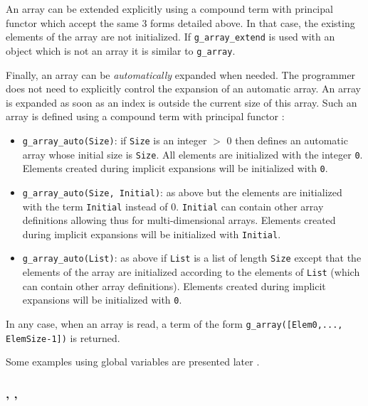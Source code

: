 An array can be extended explicitly using a compound term with principal
functor  which accept the same 3 forms detailed
above. In that case, the existing elements of the array are not
initialized. If \texttt{g\_array\_extend} is used with an object which is not
an array it is similar to \texttt{g\_array}.

Finally, an array can be \textit{automatically} expanded when needed. The
programmer does not need to explicitly control the expansion of an automatic
array. An array is expanded as soon as an index is outside the current size
of this array. Such an array is defined using a compound term with principal
functor :

\begin{itemize}

\item \texttt{g\_array\_auto(Size)}: if \texttt{Size} is an integer $>$ 0
then defines an automatic array whose initial size is \texttt{Size}. All
elements are initialized with the integer \texttt{0}. Elements
created during implicit expansions will be initialized with \texttt{0}.

\item \texttt{g\_array\_auto(Size, Initial)}: as above but the elements are
initialized with the term \texttt{Initial} instead of 0. \texttt{Initial} can
contain other array definitions allowing thus for multi-dimensional
arrays. Elements created during implicit expansions will be initialized with
\texttt{Initial}.

\item \texttt{g\_array\_auto(List)}: as above if \texttt{List} is a list of
length \texttt{Size} except that the elements of the array are initialized
according to the elements of \texttt{List} (which can contain other array
definitions). Elements created during implicit expansions will be initialized
with \texttt{0}.

\end{itemize}

In any case, when an array is read, a term of the form
\texttt{g\_array([Elem0,..., ElemSize-1])} is returned.

Some examples using global variables are presented later .

\subsubsection{,\label{g-assign/2}
               ,
               }



